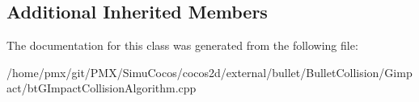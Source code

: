 \subsection*{Additional Inherited Members}


The documentation for this class was generated from the following file\+:\begin{DoxyCompactItemize}
\item 
/home/pmx/git/\+P\+M\+X/\+Simu\+Cocos/cocos2d/external/bullet/\+Bullet\+Collision/\+Gimpact/bt\+G\+Impact\+Collision\+Algorithm.\+cpp\end{DoxyCompactItemize}
